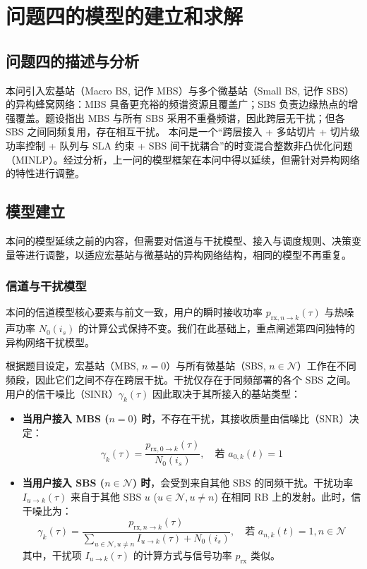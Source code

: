 \section{问题四的模型的建立和求解}
\subsection{问题四的描述与分析}

本问引入宏基站（Macro BS, 记作 MBS）与多个微基站（Small BS, 记作 SBS）的异构蜂窝网络：MBS 具备更充裕的频谱资源且覆盖广；SBS 负责边缘热点的增强覆盖。题设指出 MBS 与所有 SBS 采用不重叠频谱，因此跨层无干扰；但各 SBS 之间同频复用，存在相互干扰。
本问是一个“跨层接入 + 多站切片 + 切片级功率控制 + 队列与 SLA 约束 + SBS 间干扰耦合”的时变混合整数非凸优化问题（MINLP）。经过分析，上一问的模型框架在本问中得以延续，但需针对异构网络的特性进行调整。

\subsection{模型建立}
本问的模型延续之前的内容，但需要对信道与干扰模型、接入与调度规则、决策变量等进行调整，以适应宏基站与微基站的异构网络结构，相同的模型不再重复。

\subsubsection{信道与干扰模型}

本问的信道模型核心要素与前文一致，用户的瞬时接收功率 $p_{\mathrm{rx},n\to k}(\tau)$ 与热噪声功率 $N_0(i_s)$ 的计算公式保持不变。我们在此基础上，重点阐述第四问独特的异构网络干扰模型。

根据题目设定，宏基站（MBS, $n=0$）与所有微基站（SBS, $n \in \mathcal{N}$）工作在不同频段，因此它们之间不存在跨层干扰。干扰仅存在于同频部署的各个 SBS 之间。用户的信干噪比（SINR）$\gamma_k(\tau)$ 因此取决于其所接入的基站类型：
\begin{itemize}
    \item \textbf{当用户接入 MBS ($n=0$) 时}，不存在干扰，其接收质量由信噪比（SNR）决定：
    \begin{equation}
        \gamma_k(\tau) = \frac{p_{\mathrm{rx},0\to k}(\tau)}{N_0(i_s)}, \quad \text{若 } a_{0,k}(t)=1
    \end{equation}

    \item \textbf{当用户接入 SBS ($n \in \mathcal{N}$) 时}，会受到来自其他 SBS 的同频干扰。干扰功率 $I_{u\to k}(\tau)$ 来自于其他 SBS $u$ ($u \in \mathcal{N}, u \neq n$) 在相同 RB 上的发射。此时，信干噪比为：
    \begin{equation}
        \gamma_k(\tau) = \frac{p_{\mathrm{rx},n\to k}(\tau)}{\sum_{u \in \mathcal{N}, u \neq n} I_{u\to k}(\tau) + N_0(i_s)}, \quad \text{若 } a_{n,k}(t)=1, n \in \mathcal{N}
    \end{equation}
    其中，干扰项 $I_{u\to k}(\tau)$ 的计算方式与信号功率 $p_{\mathrm{rx}}$ 类似。
\end{itemize}

